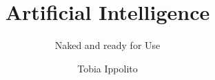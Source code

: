 
\usepackage[
	a5paper,
	top=2cm,
	bottom=2cm,
	left=2cm,
	right=2cm
]{geometry}

\usepackage[T1]{fontenc}
\usepackage{lmodern}

\usepackage[english]{babel}  %
\usepackage{blindtext}

\usepackage{microtype}

\frenchspacing

\usepackage[
	colorlinks=true,
	linkcolor=black,      %
	urlcolor=blue,       %
	citecolor=blue       %
]{hyperref}


\title{Artificial Intelligence}
\subtitle{Naked and ready for Use}
\author{Tobia Ippolito}
\date{}





